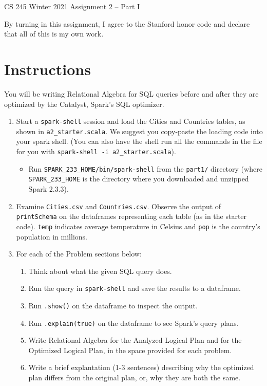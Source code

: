 \documentclass[12pt]{article}
\begin{document}
\begin{center}
{\Large CS 245 Winter 2021 Assignment 2 -- Part I}
\end{center}

By turning in this assignment, I agree to the Stanford honor code and declare
that all of this is my own work.

\section*{Instructions}
You will be writing Relational Algebra for SQL queries before and after
they are optimized by the Catalyst, Spark's SQL optimizer.

\begin{enumerate}
    \item Start a \texttt{spark-shell} session and load the Cities and Countries
        tables, as shown in \texttt{a2\_starter.scala}.
        We suggest you copy-paste the loading code into your spark shell.
        (You can also have the shell run all the commands in the file
        for you with \texttt{spark-shell -i a2\_starter.scala}).
    \begin{itemize}
        \item Run \texttt{SPARK\_233\_HOME/bin/spark-shell}
        from the \texttt{part1/} directory
        (where \\
        \texttt{SPARK\_233\_HOME} is the directory where you
        downloaded and unzipped Spark 2.3.3).

    \end{itemize}

    \item Examine \texttt{Cities.csv} and \texttt{Countries.csv}.
        Observe the output of \texttt{printSchema} on the dataframes
        representing each table (as in the starter code).
        \texttt{temp} indicates average temperature in Celsius and
        \texttt{pop} is the country's population in millions.
    \item For each of the Problem sections below:
    \begin{enumerate}
        \item Think about what the given SQL query does.
        \item Run the query in \texttt{spark-shell} and save the results to a dataframe.
        \item Run \texttt{.show()} on the dataframe to inspect the output.
        \item Run \texttt{.explain(true)} on the dataframe to see Spark's
            query plans.
        \item Write Relational Algebra for the Analyzed Logical Plan
            and for the Optimized Logical Plan, in the space provided
            for each problem.
        \item Write a brief explantation (1-3 sentences) describing why the optimized
            plan differs from the original plan, or, why they are both the same.
    \end{enumerate}
\end{enumerate}
\end{document}
